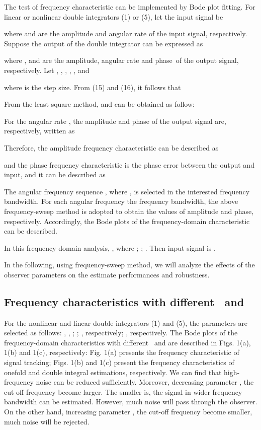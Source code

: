 \documentclass[10pt,journal]{IEEEtran}
\begin{document}
The test of frequency characteristic can be implemented by Bode plot
fitting. For linear or nonlinear double integrators (1) or (5), let the
input signal be

where  and  are the amplitude and angular rate of the input
signal, respectively. Suppose the output of the double integrator can be
expressed as

where ,  and  are the amplitude, angular rate and
phase\ of the output signal, respectively. Let , , , , , and

where  is the step size. From (15) and (16), it follows that



From the least square method,  and  can be obtained as follow:



For the angular rate , the amplitude and phase of the output signal
are, respectively, written as



Therefore, the amplitude frequency characteristic can be described as

and the phase frequency characteristic is the phase error between the output
and input, and it can be described as



The angular frequency sequence , where , is
selected in the interested frequency bandwidth. For each angular frequency
the frequency bandwidth, the above frequency-sweep method is adopted to
obtain the values of amplitude and phase, respectively. Accordingly, the
Bode plots of the frequency-domain characteristic can be described.

In this frequency-domain analysis, , where ; ; . Then input signal is .

In the following, using frequency-sweep method, we will analyze the effects
of the observer parameters on the estimate performances and robustness.

\subsection{Frequency characteristics with different \
and }

For the nonlinear and linear double integrators (1) and (5), the parameters
are selected as follows: , , ; ; , respectively; ,
respectively. The Bode plots of the frequency-domain characteristics with
different \ and  are described in Figs.
1(a), 1(b) and 1(c), respectively: Fig. 1(a) presents the frequency
characteristic of signal tracking; Figs. 1(b) and 1(c) present the frequency
characteristics of onefold and double integral estimations, respectively. We
can find that high-frequency noise can be reduced sufficiently. Moreover,
decreasing parameter , the cut-off frequency become larger.
The smaller  is, the signal in wider frequency bandwidth can
be estimated. However, much noise will pass through the observer. On the
other hand, increasing parameter , the cut-off frequency
become smaller, much noise will be rejected.
\end{document}
